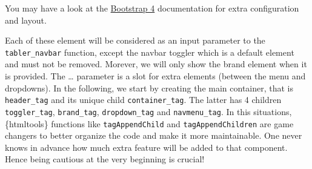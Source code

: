 \documentclass[
]{book}
\begin{document}
You may have a look at the \href{https://getbootstrap.com/docs/4.0/components/navbar/}{Bootstrap 4} documentation for extra configuration and layout.

Each of these element will be considered as an input parameter to the \texttt{tabler\_navbar} function, except the navbar toggler which is a default element and must not be removed. Morever, we will only show the brand element when it is provided. The \ldots{} parameter is a slot for extra elements (between the menu and dropdowns). In the following, we start by creating the main container, that is \texttt{header\_tag} and its unique child \texttt{container\_tag}. The latter has 4 children \texttt{toggler\_tag}, \texttt{brand\_tag}, \texttt{dropdown\_tag} and \texttt{navmenu\_tag}. In this situations, \{htmltools\} functions like \texttt{tagAppendChild} and \texttt{tagAppendChildren} are game changers to better organize the code and make it more maintainable. One never knows in advance how much extra feature will be added to that component. Hence being cautious at the very beginning is crucial!
\end{document}
